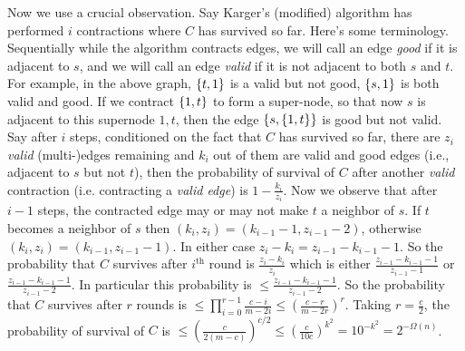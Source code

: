 Now we use a crucial observation. Say Karger's (modified) algorithm has performed $i$ contractions where $C$ has survived so far. Here's some terminology. Sequentially while the algorithm contracts edges, we will call an edge \textit{good} if it is adjacent to $s$, and we will call an edge \textit{valid} if it is not adjacent to both $s$ and $t$. For example, in the above graph, $\left\{t,1\right\}$ is a valid but not good, $\left\{s,1\right\}$ is both valid and good. If we contract $\left\{1,t\right\}$ to form a super-node, so that now $s$ is adjacent to this supernode ${1,t}$, then the edge $\left\{s,\left\{1,t\right\}\right\}$ is good but not valid. Say after $i$ steps, conditioned on the fact that $C$ has survived so far, there are $z_{i}$ \textit{valid} (multi-)edges remaining and $k_{i}$ out of them are valid and good edges (i.e., adjacent to $s$ but not $t$), then the probability of survival of $C$ after another \textit{valid} contraction (i.e. contracting a \textit{valid edge}) is $1-\frac{k_{i}}{z_{i}}$. Now we observe that after $i-1$ steps, the contracted edge may or may not make $t$ a neighbor of $s$. If $t$ becomes a neighbor of $s$ then $(k_{i},z_{i}) = (k_{i-1}-1,z_{i-1}-2)$, otherwise $(k_{i},z_{i}) = (k_{i-1},z_{i-1}-1)$. In either case $z_{i}-k_{i} = z_{i-1}-k_{i-1}-1$. So the probability that $C$ survives after $i^{\text{th}}$ round is $\frac{z_{i}-k_{i}}{z_{i}}$ which is either $\frac{z_{i-1}-k_{i-1}-1}{z_{i-1}-1}$ or $\frac{z_{i-1}-k_{i-1}-1}{z_{i-1}-2}$. In particular this probability is $\le \frac{z_{i-1}-k_{i-1}-1}{z_{i-1}-2}$. So the probability that $C$ survives after $r$ rounds is $\le \prod_{i=0}^{r-1}\frac{c-i}{m-2i}\le \left(\frac{c-r}{m-2r}\right)^{r}$. Taking $r=\frac{c}{2}$, the probability of survival of $C$ is $\le \left(\frac{c}{2(m-c)}\right)^{c/2} \le \left(\frac{c}{10c}\right)^{k^{2}} = 10^{-k^{2}} = 2^{-\Omega(n)}$. 



















